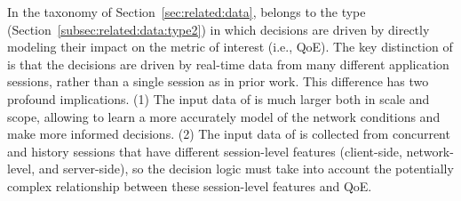 
In the taxonomy of Section~\ref{sec:related:data}, \ddn belongs to the type 
(Section~\ref{subsec:related:data:type2}) in which decisions are driven by 
directly modeling their impact on the metric of interest (i.e., QoE).
The key distinction of \ddn is that the decisions are driven by real-time data 
from many different application sessions, rather than a single session as in
prior work. This difference has two profound implications.
(1) The input data of \ddn is much larger both in scale and scope, allowing 
\ddn to learn a more accurately model of the network conditions and make 
more informed decisions.
(2) The input data of \ddn is collected from concurrent and history sessions 
that have different session-level features (client-side, network-level, and server-side), 
so the \ddn decision logic must take into account the potentially complex 
relationship between these session-level features and QoE.


